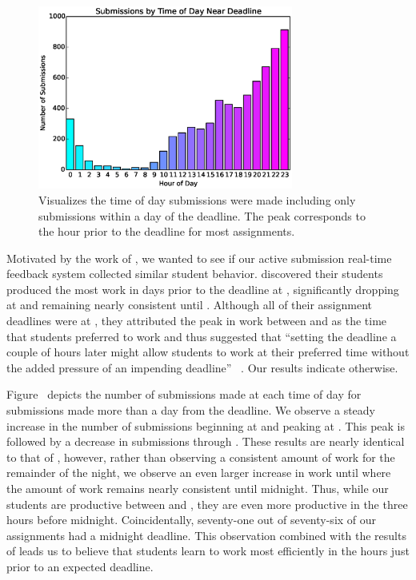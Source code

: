 \begin{figure}[!t]
\centering
\includegraphics[width=3.3in]{graphs/Submissions_by_Time_of_Day_Near_Deadline.eps}
\caption{Visualizes the time of day submissions were made including only
  submissions within a day of the deadline. The  peak corresponds to the
  hour prior to the deadline for most assignments.}
\end{figure}

Motivated by the work of \spacco{}, we wanted to see if our active submission
real-time feedback system collected similar student behavior. \spacco{}
discovered their students produced the most work in days prior to the deadline
at , significantly dropping at  and remaining nearly consistent
until . Although all of their assignment deadlines were at , they
attributed the peak in work between  and  as the time that students
preferred to work and thus suggested that ``setting the deadline a couple of
hours later might allow students to work at their preferred time without the
added pressure of an impending deadline''
~\cite{Spacco:2013:TIP:2462476.2465594}. Our results indicate otherwise.

Figure~ depicts the number of submissions made at
each time of day for submissions made more than a day from the deadline. We
observe a steady increase in the number of submissions beginning at  and
peaking at . This peak is followed by a decrease in submissions through
. These results are nearly identical to that of \spacco{}, however,
rather than observing a consistent amount of work for the remainder of the
night, we observe an even larger increase in work until  where the amount
of work remains nearly consistent until midnight. Thus, while our students are
productive between  and , they are even more productive in the
three hours before midnight. Coincidentally, seventy-one out of seventy-six of
our assignments had a midnight deadline. This observation combined with the
results of \spacco{} leads us to believe that students learn to work most
efficiently in the hours just prior to an expected deadline.

